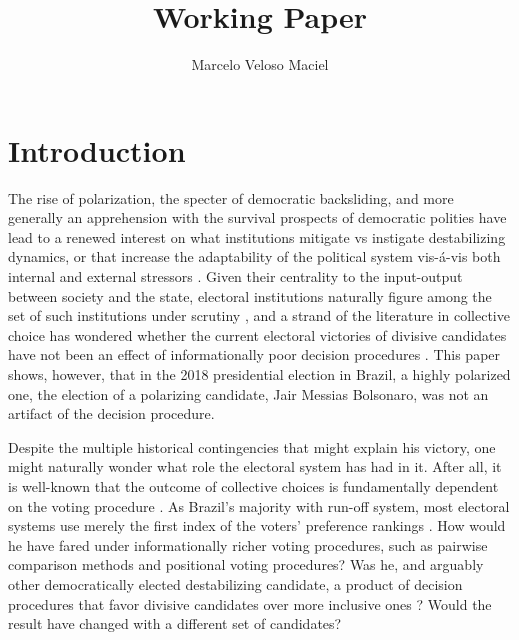 \documentclass[hidelinks,11pt]{article}
\author{Marcelo Veloso Maciel}
\date{}
\title{Working Paper}
\begin{document}
\maketitle



\section{Introduction}
The rise of polarization, the specter of democratic backsliding, and more
generally an apprehension with the survival prospects of democratic polities
have lead to a renewed interest on what institutions mitigate vs instigate
destabilizing dynamics, or that increase the adaptability of the political
system vis-{\'a}-vis both internal and external stressors
\parencite{Bednare2113843118, przeworski2019crises, chiopris2021wolf,
  aligica2014institutional}. Given their centrality to the input-output between
society and the state, electoral institutions naturally figure among the set of
such institutions under scrutiny \parencite{Wange2021systems}, and a strand of
the literature in collective choice has wondered whether the current electoral
victories of divisive candidates have not been an effect of informationally poor
decision procedures \parencite{potthoff2021condorcet, kurrild2018trump,
  woon2020trump}. This paper shows, however, that in the 2018 presidential
election in Brazil, a highly polarized one, the election of a polarizing
candidate, Jair Messias Bolsonaro, was not an artifact of the decision
procedure.


Despite the multiple historical contingencies that might explain his victory,
one might naturally wonder what role the electoral system has had in it. After
all, it is well-known that the outcome of collective choices is fundamentally
dependent on the voting procedure \parencite{riker1982liberalism}. As Brazil's
majority with run-off system, most electoral systems use merely the first index
of the voters' preference rankings \parencite{grofman04_if_you_like_alter_vote}.
How would he have fared under informationally richer voting procedures, such as
pairwise comparison methods and positional voting procedures? Was he, and
arguably other democratically elected destabilizing candidate, a product of
decision procedures that favor divisive candidates over more inclusive ones
\parencite{igersheim22_compar_votin_method}? Would the result have changed with
a different set of candidates?
\end{document}

